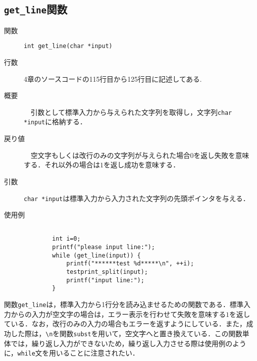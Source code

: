\documentclass[a4j,11pt]{jarticle}
\begin{document}
\subsection{\texttt{get\_line}関数}
 \begin{description}
    \item[関数] \verb|int get_line(char *input)|
    \item[行数]  4章のソースコードの115行目から125行目に記述してある.
    \item[概要]　引数として標準入力から与えられた文字列を取得し，文字列\verb|char *input|に格納する．
    \item[戻り値]　空文字もしくは改行のみの文字列が与えられた場合$0$を返し失敗を意味する．それ以外の場合は$1$を返し成功を意味する． 
    \item[引数]  \verb|char *input|は標準入力から入力された文字列の先頭ポインタを与える．
    \item[使用例]
      \begin{verbatim}

        int i=0;
        printf("please input line:");
   	    while (get_line(input)) {
   	        printf("******test %d*****\n", ++i);
   	        testprint_split(input);
   	        printf("input line:");
   	    }
      \end{verbatim}
\end{description}
関数\verb|get_line|は，標準入力から1行分を読み込ませるための関数である．標準入力からの入力が空文字の場合は，エラー表示を行わせて失敗を意味する$1$を返している．なお，改行のみの入力の場合もエラーを返すようにしている．また，成功した際は，\verb|\n|を関数\verb|subst|を用いて，空文字へと置き換えている．この関数単体では，繰り返し入力ができないため，繰り返し入力させる際は使用例のように，\verb|while|文を用いることに注意されたい．
\end{document}
